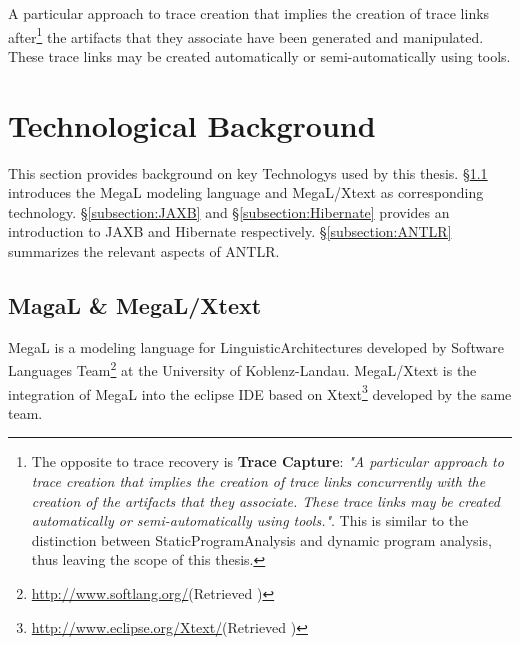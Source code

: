 \begin{definition}
A particular approach to trace creation that implies the creation of trace links after\footnote{The opposite to trace recovery is \textbf{Trace Capture}: \textit{"A particular approach to trace creation that implies the creation of trace links concurrently with the creation of the artifacts that they associate. These trace links may be created automatically or semi-automatically using tools."}\cite{DBLP:books/daglib/p/GotelCHZEGDAMM12}. This is similar to the distinction between \gls{StaticProgramAnalysis} and dynamic program analysis, thus leaving the scope of this thesis.} the artifacts that they associate have been generated and manipulated.
These trace links may be created automatically or semi-automatically using tools. 
\cite{DBLP:books/daglib/p/GotelCHZEGDAMM12}
\end{definition}


\section{Technological Background}
This section provides background on key \glspl{Technology} used by this thesis.
§\ref{subsection:MegaLXText} introduces the \gls{MegaL} modeling language and \gls{MegaL/Xtext} as corresponding technology.
§\ref{subsection:JAXB} and §\ref{subsection:Hibernate} provides an introduction to \gls{JAXB} and \gls{Hibernate} respectively.
§\ref{subsection:ANTLR} summarizes the relevant aspects of \gls{ANTLR}.

\subsection{MagaL \& MegaL/Xtext}
\label{subsection:MegaLXText}
\gls{MegaL} \cite{DBLP:conf/ecmdafa/LammelV14} \cite{DBLP:conf/models/FavreLV12} is a modeling language for \glspl{LinguisticArchitecture} developed by Software Languages Team\footnote{\url{http://www.softlang.org/}(Retrieved )} at the University of Koblenz-Landau.
\gls{MegaL/Xtext} \cite{LukasHaertelBScThesis} \cite{HaertelHHLV17} is the integration of \gls{MegaL} into the eclipse \gls{IDE} based on Xtext\footnote{\url{http://www.eclipse.org/Xtext/}(Retrieved )} developed by the same team.

